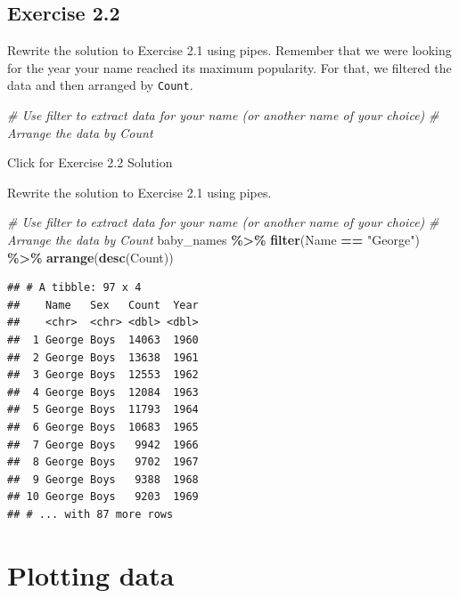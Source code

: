\documentclass[
]{book}
\newenvironment{Shaded}{\begin{snugshade}}{\end{snugshade}}
\newcommand{\CommentTok}[1]{\textcolor[rgb]{0.56,0.35,0.01}{\textit{#1}}}
\newcommand{\KeywordTok}[1]{\textcolor[rgb]{0.13,0.29,0.53}{\textbf{#1}}}
\newcommand{\NormalTok}[1]{#1}
\newcommand{\OperatorTok}[1]{\textcolor[rgb]{0.81,0.36,0.00}{\textbf{#1}}}
\newcommand{\StringTok}[1]{\textcolor[rgb]{0.31,0.60,0.02}{#1}}
\begin{document}
\hypertarget{exercise-2.2}{%
\subsection{Exercise 2.2}\label{exercise-2.2}}

Rewrite the solution to Exercise 2.1 using pipes. Remember that we were looking for the year your name reached its maximum popularity. For that, we filtered the data and then arranged by \texttt{Count}.

\begin{Shaded}
\begin{Highlighting}[]
\CommentTok{\# Use filter to extract data for your name (or another name of your choice)}
\CommentTok{\# Arrange the data by Count}
\end{Highlighting}
\end{Shaded}

{Click for Exercise 2.2 Solution}

Rewrite the solution to Exercise 2.1 using pipes.

\begin{Shaded}
\begin{Highlighting}[]
\CommentTok{\# Use filter to extract data for your name (or another name of your choice)}
\CommentTok{\# Arrange the data by Count}
\NormalTok{baby\_names }\OperatorTok{\%\textgreater{}\%}\StringTok{ }
\StringTok{    }\KeywordTok{filter}\NormalTok{(Name }\OperatorTok{==}\StringTok{ "George"}\NormalTok{) }\OperatorTok{\%\textgreater{}\%}
\StringTok{    }\KeywordTok{arrange}\NormalTok{(}\KeywordTok{desc}\NormalTok{(Count))}
\end{Highlighting}
\end{Shaded}

\begin{verbatim}
## # A tibble: 97 x 4
##    Name   Sex   Count  Year
##    <chr>  <chr> <dbl> <dbl>
##  1 George Boys  14063  1960
##  2 George Boys  13638  1961
##  3 George Boys  12553  1962
##  4 George Boys  12084  1963
##  5 George Boys  11793  1964
##  6 George Boys  10683  1965
##  7 George Boys   9942  1966
##  8 George Boys   9702  1967
##  9 George Boys   9388  1968
## 10 George Boys   9203  1969
## # ... with 87 more rows
\end{verbatim}

\hypertarget{plotting-data}{%
\section{Plotting data}\label{plotting-data}}
\end{document}
